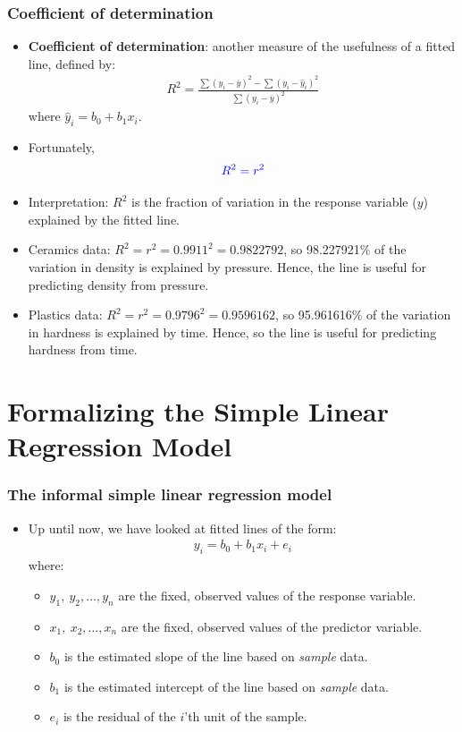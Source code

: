 \documentclass[handout]{beamer}\usepackage[]{graphicx}\usepackage[]{color}
\providecommand{\ov}[1]{\overline{#1}}
\providecommand{\wh}[1]{\widehat{#1}}
\numberwithin{equation}{section}
\begin{document}
\begin{frame}
\frametitle{Coefficient of determination} \scriptsize
\begin{itemize}
\item {\bf Coefficient of determination}: another measure of the usefulness of a fitted line, defined by:
\begin{align*}
R^2 = \frac{\sum(y_i - \ov{y})^2 - \sum(y_i - \wh{y}_i)^2}{\sum(y_i - \ov{y})^2}
\end{align*}
where $\wh{y}_i = b_0 + b_1 x_i$. 
\pause \item Fortunately,
\begin{align*} \color{blue}
R^2 = r^2
\end{align*}
\pause \item Interpretation: $R^2$ is the fraction of variation in the response variable ($y$) explained by the fitted line.
\pause \item Ceramics data: $R^2 = r^2 = 0.9911^2 = 0.9822792$, so  98.227921\% of the variation in density is explained by pressure. Hence, the line is useful for predicting density from pressure.
\pause \item Plastics data: $R^2 = r^2 = 0.9796^2 = 0.9596162$, so  95.961616\% of the variation in hardness is explained by time. Hence, so the line is useful for predicting hardness from time.
\end{itemize}
\end{frame}

\section{Formalizing the Simple Linear Regression Model}

\begin{frame}
\frametitle{The informal simple linear regression model}
\begin{itemize}
\item Up until now, we have looked at fitted lines of the form:
\begin{align*}
y_i = b_0 + b_1 x_i + e_i
\end{align*}
where:
\begin{itemize}
\pause \item $y_1, \ y_2, \ldots, y_n$ are the fixed, observed values of the response variable.
\pause \item $x_1, \ x_2, \ldots, x_n$ are the fixed, observed values of the predictor variable.
\pause \item $b_0$ is the estimated slope of the line based on \emph{sample} data.
\pause \item $b_1$ is the estimated intercept of the line based on \emph{sample} data.
\pause \item $e_i$ is the residual of the $i$'th unit of the sample.
\end{itemize}
\end{itemize}
\end{frame}
\end{document}
